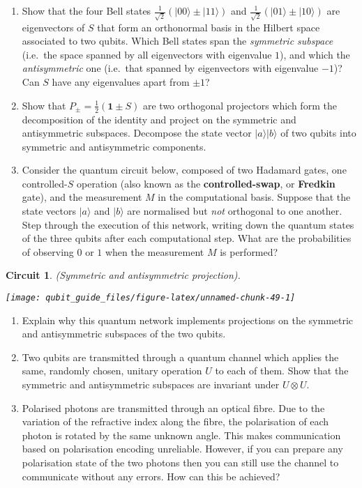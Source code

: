 \documentclass[fleqn]{article}
\newtheorem*{circuit}{Circuit}
\begin{document}
\begin{enumerate}
\def\labelenumi{\arabic{enumi}.}
\item
  Show that the four Bell states \(\frac{1}{\sqrt2}(|00\rangle\pm|11\rangle)\) and \(\frac{1}{\sqrt2}(|01\rangle\pm|10\rangle)\) are eigenvectors of \(S\) that form an orthonormal basis in the Hilbert space associated to two qubits.
  Which Bell states span the \emph{symmetric subspace} (i.e.~the space spanned by all eigenvectors with eigenvalue \(1\)), and which the \emph{antisymmetric} one (i.e.~that spanned by eigenvectors with eigenvalue \(-1\))?
  Can \(S\) have any eigenvalues apart from \(\pm1\)?
\item
  Show that \(P_\pm = \frac12(\mathbf{1}\pm S)\) are two orthogonal projectors which form the decomposition of the identity and project on the symmetric and antisymmetric subspaces.
  Decompose the state vector \(|a\rangle|b\rangle\) of two qubits into symmetric and antisymmetric components.
\item
  Consider the quantum circuit below, composed of two Hadamard gates, one controlled-\(S\) operation (also known as the \textbf{controlled-swap}, or \textbf{Fredkin} gate), and the measurement \(M\) in the computational basis.
  Suppose that the state vectors \(|a\rangle\) and \(|b\rangle\) are normalised but \emph{not} orthogonal to one another.
  Step through the execution of this network, writing down the quantum states of the three qubits after each computational step.
  What are the probabilities of observing \(0\) or \(1\) when the measurement \(M\) is performed?
\end{enumerate}

\begin{circuit}

(Symmetric and antisymmetric projection).

\begin{center}\texttt{[image: qubit\_guide\_files/figure-latex/unnamed-chunk-49-1]} \end{center}


\end{circuit}

\begin{enumerate}
\def\labelenumi{\arabic{enumi}.}
\setcounter{enumi}{3}
\item
  Explain why this quantum network implements projections on the symmetric and antisymmetric subspaces of the two qubits.
\item
  Two qubits are transmitted through a quantum channel which applies the same, randomly chosen, unitary operation \(U\) to each of them.
  Show that the symmetric and antisymmetric subspaces are invariant under \(U\otimes U\).
\item
  Polarised photons are transmitted through an optical fibre.
  Due to the variation of the refractive index along the fibre, the polarisation of each photon is rotated by the same unknown angle.
  This makes communication based on polarisation encoding unreliable.
  However, if you can prepare any polarisation state of the two photons then you can still use the channel to communicate without any errors.
  How can this be achieved?
\end{enumerate}
\end{document}
